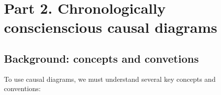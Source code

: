 \documentclass[
  singlecolumn]{report}
\begin{document}
\hypertarget{part-2.-chronologically-conscienscious-causal-diagrams}{%
\section{Part 2. Chronologically conscienscious causal
diagrams}\label{part-2.-chronologically-conscienscious-causal-diagrams}}

\hypertarget{background-concepts-and-convetions}{%
\subsection{Background: concepts and
convetions}\label{background-concepts-and-convetions}}

To use causal diagrams, we must understand several key concepts and
conventions:
\end{document}
